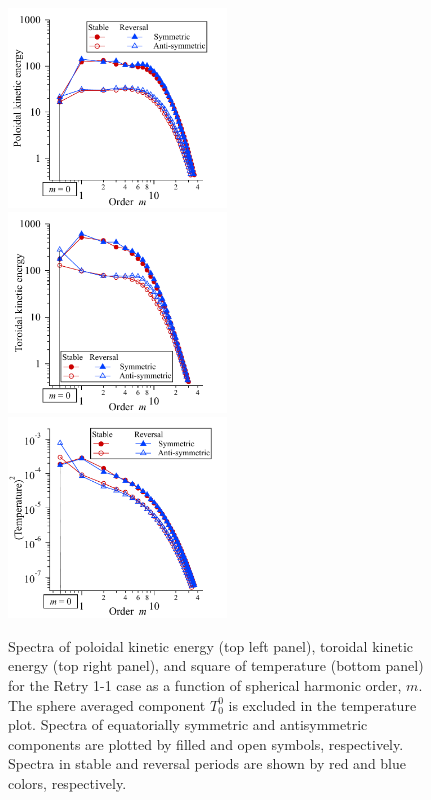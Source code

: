 \begin{figure}[tb]
\hfill
\includegraphics*[width=58mm]{Figures/Kpol_spectr_m.pdf} %
\hfill
\includegraphics*[width=58mm]{Figures/Ktor_spectr_m.pdf} \hfill \\
\includegraphics*[width=58mm]{Figures/Temp_spectr_m.pdf}
\caption{
Spectra of poloidal kinetic energy (top left panel), toroidal kinetic energy (top right panel), and square of temperature (bottom panel) 
{\color{teal}
for the Retry 1-1 case 
}
as a function of spherical harmonic order, $m$. 
The sphere averaged component $T_{0}^{0}$ is excluded in the temperature plot.
Spectra of equatorially symmetric and antisymmetric components are plotted by filled and open symbols, respectively.
Spectra in stable and reversal periods are shown by red and blue colors, respectively.
}
\label{fig:KE_temp_spectra_m}
\end{figure}
